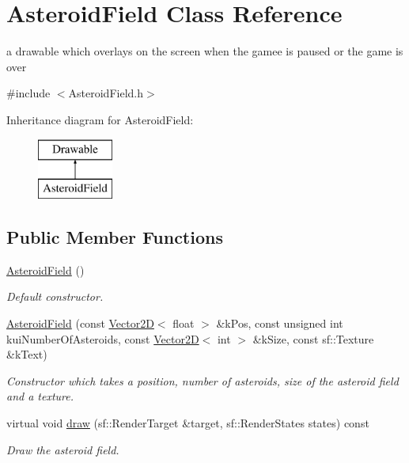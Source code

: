 \hypertarget{class_asteroid_field}{\section{Asteroid\+Field Class Reference}
\label{class_asteroid_field}
}


a drawable which overlays on the screen when the gamee is paused or the game is over  




{\ttfamily \#include $<$Asteroid\+Field.\+h$>$}

Inheritance diagram for Asteroid\+Field\+:\begin{figure}[H]
\begin{center}
\leavevmode
\includegraphics[height=2.000000cm]{class_asteroid_field}
\end{center}
\end{figure}
\subsection*{Public Member Functions}
\begin{DoxyCompactItemize}
\item 
\hypertarget{class_asteroid_field_a9daa07f82c9db387fa3612bed2c838a1}{\hyperlink{class_asteroid_field_a9daa07f82c9db387fa3612bed2c838a1}{Asteroid\+Field} ()}\label{class_asteroid_field_a9daa07f82c9db387fa3612bed2c838a1}

\begin{DoxyCompactList}\small\item\em Default constructor. \end{DoxyCompactList}\item 
\hyperlink{class_asteroid_field_aabdc29f8581421b92fb498d2b2a1d879}{Asteroid\+Field} (const \hyperlink{class_vector2_d}{Vector2\+D}$<$ float $>$ \&k\+Pos, const unsigned int kui\+Number\+Of\+Asteroids, const \hyperlink{class_vector2_d}{Vector2\+D}$<$ int $>$ \&k\+Size, const sf\+::\+Texture \&k\+Text)
\begin{DoxyCompactList}\small\item\em Constructor which takes a position, number of asteroids, size of the asteroid field and a texture. \end{DoxyCompactList}\item 
virtual void \hyperlink{class_asteroid_field_a4ba084eea3b8664c6b4fc6de61c9bc63}{draw} (sf\+::\+Render\+Target \&target, sf\+::\+Render\+States states) const 
\begin{DoxyCompactList}\small\item\em Draw the asteroid field. \end{DoxyCompactList}\end{DoxyCompactItemize}

